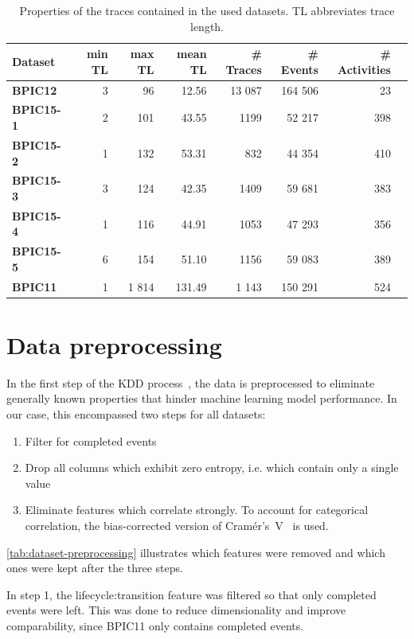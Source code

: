 \begin{table}[]
\centering
\begin{tabular}{lrrrrrrr}
\textbf{Dataset} & \textbf{min TL} & \textbf{max TL} &  \textbf{mean TL} & \textbf{\# Traces} & \textbf{\# Events} & \textbf{\# Activities} \\
\hline
\textbf{BPIC12} & 3 & 96 & 12.56 & 13 087 & 164 506 & 23\\
\textbf{BPIC15-1} & 2 & 101 & 43.55 & 1199 & 52 217 & 398\\
\textbf{BPIC15-2} & 1 & 132 & 53.31 & 832 & 44 354 & 410\\
\textbf{BPIC15-3} & 3 & 124 & 42.35 & 1409 & 59 681 & 383\\
\textbf{BPIC15-4} & 1 & 116 & 44.91 & 1053 & 47 293 & 356\\
\textbf{BPIC15-5} & 6 & 154 & 51.10 & 1156 & 59 083 & 389\\
\textbf{BPIC11} & 1 & 1 814 & 131.49 & 1 143 & 150 291 & 524\\
\end{tabular}
\caption{Properties of the traces contained in the used datasets. TL abbreviates trace length.}
\label{tab:dataset-characteristics}
\end{table}

\section{Data preprocessing}
\label{sec:eval:data-preprocessing}
In the first step of the KDD process~\cite{fayyad1996data}, the data is preprocessed to eliminate generally known properties that hinder machine learning model performance. In our case, this encompassed two steps for all datasets:

\begin{enumerate}
    \item Filter for completed events
    \item Drop all columns which exhibit zero entropy, i.e. which contain only a single value
    \item Eliminate features which correlate strongly. To account for categorical correlation, the bias-corrected version of Cramér's~V~\cite{bergsma2013bias} is used.
\end{enumerate}

\autoref{tab:dataset-preprocessing} illustrates which features were removed and which ones were kept after the three steps.

In step 1, the lifecycle:transition feature was filtered so that only completed events were left. This was done to reduce dimensionality and improve comparability, since BPIC11 only contains completed events.


